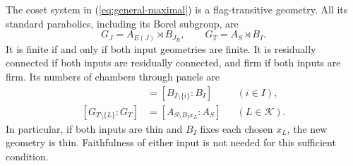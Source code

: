 \begin{theorem}\label{thm:general-twist}
The coset system in (\ref{eq:general-maximal}) is a flag-transitive
geometry. All its standard parabolics, including its Borel subgroup, are
\begin{equation}\label{eq:general-parabolics}
 G_J=A_{E(J)}\rtimes B_{J_B},\qquad G_T=A_S\rtimes B_I.
\end{equation}
It is finite if and only if both input geometries are finite. It is
residually connected if both inputs are residually connected, and firm
if both inputs are firm. Its numbers of chambers through panels are
\begin{align}
 [G_{T\setminus\{i\}}:G_T]&=[B_{I\setminus\{i\}}:B_I]
       &&(i\in I),\label{eq:old-panel}\\
 [G_{T\setminus\{L\}}:G_T]&=[A_{S\setminus B_Ix_L}:A_S]
       &&(L\in\mathcal K).\label{eq:new-panel}
\end{align}
In particular, if both inputs are thin and $B_I$ fixes each chosen
$x_L$, the new geometry is thin. Faithfulness of either input is not
needed for this sufficient condition.
\end{theorem}
